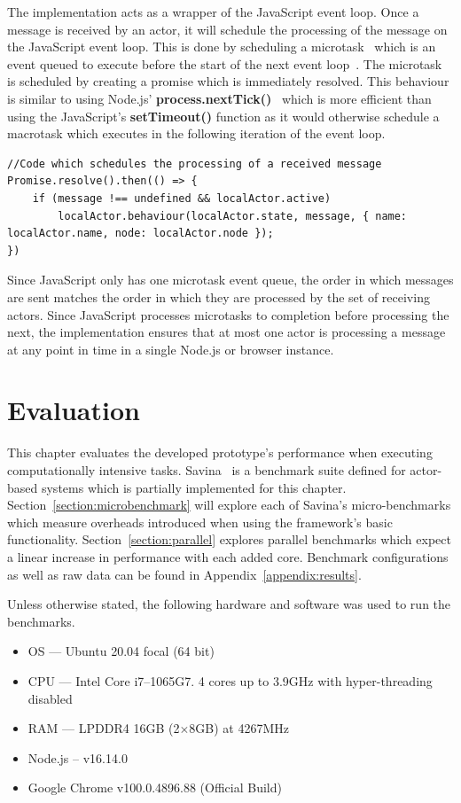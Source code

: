 \documentclass[oneside]{um-fict}
\begin{document}
The implementation acts as a wrapper of the JavaScript event loop. Once a message is received by an actor, it will schedule the processing of the message on the JavaScript event loop. This is done by scheduling a microtask~\cite{microtasks} which is an event queued to execute before the start of the next event loop~\cite{eventloopbrowser}\cite{eventloopnode}. The microtask is scheduled by creating a promise which is immediately resolved. This behaviour is similar to using Node.js' \textbf{process.nextTick()}~\cite{nexttick} which is more efficient than using the JavaScript's \textbf{setTimeout()} function as it would otherwise schedule a macrotask which executes in the following iteration of the event loop.
\begin{lstlisting}
//Code which schedules the processing of a received message
Promise.resolve().then(() => {
    if (message !== undefined && localActor.active)
        localActor.behaviour(localActor.state, message, { name: localActor.name, node: localActor.node });
})
\end{lstlisting}

Since JavaScript only has one microtask event queue, the order in which messages are sent matches the order in which they are processed by the set of receiving actors. Since JavaScript processes microtasks to completion before processing the next, the implementation ensures that at most one actor is processing a message at any point in time in a single Node.js or browser instance.

\chapter{Evaluation}\label{chap:evaluation}
This chapter evaluates the developed prototype's performance when executing computationally intensive tasks. Savina~\cite{savina} is a benchmark suite defined for actor-based systems which is partially implemented for this chapter. Section~\ref{section:microbenchmark} will explore each of Savina's micro-benchmarks which measure overheads introduced when using the framework's basic functionality. Section~\ref{section:parallel} explores parallel benchmarks which expect a linear increase in performance with each added core. Benchmark configurations as well as raw data can be found in Appendix~\ref{appendix:results}.

Unless otherwise stated, the following hardware and software was used to run the benchmarks.
\begin{itemize}
    \item OS --- Ubuntu 20.04 focal (64 bit)
    \item CPU --- Intel Core i7--1065G7. 4 cores up to 3.9GHz with hyper-threading disabled
    \item RAM --- LPDDR4 16GB (2$\times$8GB) at 4267MHz
    \item Node.js – v16.14.0
    \item Google Chrome v100.0.4896.88 (Official Build)
\end{itemize}
\end{document}
